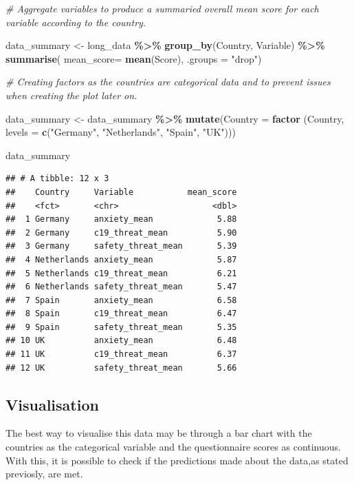 \documentclass[
]{article}
\newenvironment{Shaded}{\begin{snugshade}}{\end{snugshade}}
\newcommand{\AttributeTok}[1]{\textcolor[rgb]{0.13,0.29,0.53}{#1}}
\newcommand{\CommentTok}[1]{\textcolor[rgb]{0.56,0.35,0.01}{\textit{#1}}}
\newcommand{\FunctionTok}[1]{\textcolor[rgb]{0.13,0.29,0.53}{\textbf{#1}}}
\newcommand{\NormalTok}[1]{#1}
\newcommand{\OtherTok}[1]{\textcolor[rgb]{0.56,0.35,0.01}{#1}}
\newcommand{\SpecialCharTok}[1]{\textcolor[rgb]{0.81,0.36,0.00}{\textbf{#1}}}
\newcommand{\StringTok}[1]{\textcolor[rgb]{0.31,0.60,0.02}{#1}}
\begin{document}
\begin{Shaded}
\begin{Highlighting}[]
\CommentTok{\# Aggregate variables to produce a summaried overall mean score for each variable according to the country. }

\NormalTok{data\_summary }\OtherTok{\textless{}{-}}\NormalTok{  long\_data }\SpecialCharTok{\%\textgreater{}\%}
  \FunctionTok{group\_by}\NormalTok{(Country, Variable) }\SpecialCharTok{\%\textgreater{}\%} 
  \FunctionTok{summarise}\NormalTok{( }\AttributeTok{mean\_score=} \FunctionTok{mean}\NormalTok{(Score), }\AttributeTok{.groups =} \StringTok{"drop"}\NormalTok{)}


\CommentTok{\# Creating factors as the countries are categorical data and to prevent issues when creating the plot later on. }

\NormalTok{data\_summary }\OtherTok{\textless{}{-}}\NormalTok{ data\_summary }\SpecialCharTok{\%\textgreater{}\%} 
  \FunctionTok{mutate}\NormalTok{(}\AttributeTok{Country =} \FunctionTok{factor}\NormalTok{ (Country, }\AttributeTok{levels =} \FunctionTok{c}\NormalTok{(}\StringTok{"Germany"}\NormalTok{, }\StringTok{"Netherlands"}\NormalTok{, }\StringTok{"Spain"}\NormalTok{, }\StringTok{"UK"}\NormalTok{)))}

\NormalTok{data\_summary}
\end{Highlighting}
\end{Shaded}

\begin{verbatim}
## # A tibble: 12 x 3
##    Country     Variable           mean_score
##    <fct>       <chr>                   <dbl>
##  1 Germany     anxiety_mean             5.88
##  2 Germany     c19_threat_mean          5.90
##  3 Germany     safety_threat_mean       5.39
##  4 Netherlands anxiety_mean             5.87
##  5 Netherlands c19_threat_mean          6.21
##  6 Netherlands safety_threat_mean       5.47
##  7 Spain       anxiety_mean             6.58
##  8 Spain       c19_threat_mean          6.47
##  9 Spain       safety_threat_mean       5.35
## 10 UK          anxiety_mean             6.48
## 11 UK          c19_threat_mean          6.37
## 12 UK          safety_threat_mean       5.66
\end{verbatim}

\subsection{Visualisation}\label{visualisation}

The best way to visualise this data may be through a bar chart with the
countries as the categorical variable and the questionnaire scores as
continuous. With this, it is possible to check if the predictions made
about the data,as stated previosly, are met.
\end{document}
